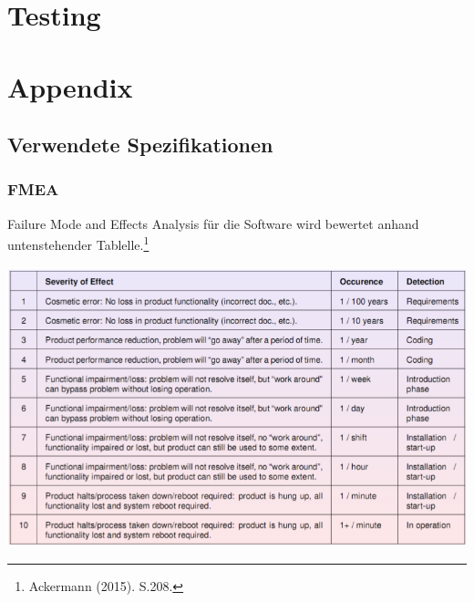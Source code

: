 \documentclass[a4paper]{scrreprt}
\begin{document}
\chapter{Testing}



\chapter{Appendix}

\section{Verwendete Spezifikationen}
\subsection{FMEA}
Failure Mode and Effects Analysis für die Software wird bewertet anhand untenstehender Tablelle.\footnote{Ackermann (2015). S.208.}

\includegraphics[width=1\textwidth]{img/fmea.png}
\end{document}
